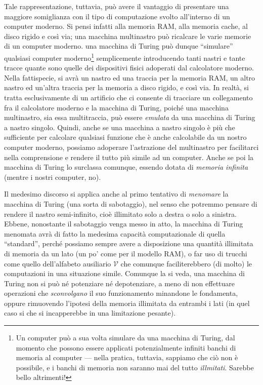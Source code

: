 \documentclass[10pt]{\classname}
\begin{document}
Tale rappresentazione, tuttavia, può avere il vantaggio di presentare una
maggiore somiglianza con il tipo di computazione svolto all'interno di un
computer moderno. Si pensi infatti alla memoria RAM, alla memoria cache, al
disco rigido e così via; una macchina multinastro può ricalcare le varie memorie di un computer moderno. una macchina di Turing può dunque ``simulare''
qualsiasi computer moderno\footnote{Un computer può a sua volta simulare da una
macchina di Turing, dal momento che possono essere applicati potenzialmente
infiniti banchi di memoria al computer --- nella pratica, tuttavia, sappiamo
che ciò non è possibile, e i banchi di memoria non saranno mai del tutto
\emph{illmitati}. Sarebbe bello altrimenti!} semplicemente introducendo tanti nastri e tante tracce quante
sono quelle dei dispositivi fisici adoperati dal calcolatore moderno. Nella
fattispecie, si avrà un nastro ed una traccia per la memoria RAM, un altro
nastro ed un'altra traccia per la memoria a disco rigido, e così via. In
realtà, si tratta esclusivamente di un artificio che ci consente di tracciare
un collegamento fra il calcolatore moderno e la macchina di Turing, poiché una
macchina multinastro, sia essa multitraccia, può essere \emph{emulata} da una
macchina di Turing a nastro singolo. Quindi, anche se una macchina a nastro
singolo è più che sufficiente per calcolare qualsiasi funzione che è anche
calcolabile da un nostro computer moderno, possiamo adoperare l'astrazione del
multinastro per facilitarci nella comprensione e rendere il tutto più simile ad
un computer. Anche se poi la macchina di Turing lo surclassa comunque, essendo
dotata di \emph{memoria infinita} (mentre i nostri computer, no).

Il medesimo discorso si applica anche al primo tentativo di \emph{menomare} la
macchina di Turing (una sorta di sabotaggio), nel senso che potremmo pensare di
rendere il nastro semi-infinito, cioè illimitato solo a destra o solo a
sinistra. Ebbene, nonostante il sabotaggio venga messo in atto,
la macchina di Turing menomata avrà di fatto la medesima capacità
computazionale di quella ``standard'', perché possiamo sempre avere a
disposizione una quantità illimitata di memoria da un lato (un po' come per il
modello RAM), o far uso di trucchi come quello dell'alfabeto ausiliario
$\mathcal V$ che comunque faciliterebbero (di molto) le computazioni in una situazione
simile. Comunque la si veda, una macchina di Turing non si può né potenziare né
depotenziare, a meno di non effettuare operazioni che \emph{sconvolgano} il suo
funzionamento minandone le fondamenta, oppure rimuovendo l'ipotesi della
memoria illimitata da entrambi i lati (in quel caso si che si incapperebbe in
una limitazione pesante).
\end{document}
